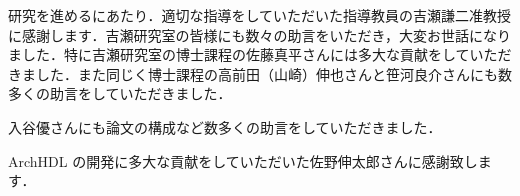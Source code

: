 研究を進めるにあたり．適切な指導をしていただいた指導教員の吉瀬謙二准教授に感謝します．吉瀬研究室の皆様にも数々の助言をいただき，大変お世話になりました．特に吉瀬研究室の博士課程の佐藤真平さんには多大な貢献をしていただきました．また同じく博士課程の高前田（山崎）伸也さんと笹河良介さんにも数多くの助言をしていただきました．

入谷優さんにも論文の構成など数多くの助言をしていただきました．

ArchHDL の開発に多大な貢献をしていただいた佐野伸太郎さんに感謝致します．
